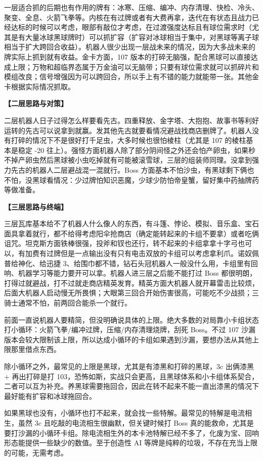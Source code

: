 \documentclass[12pt, a4paper]{article}
\begin{document}
一层适合抓的后期也有作用的牌有：冰寒、压缩、编冲、内存清理、快检、冷头、聚变、全息、火箭飞拳等。内核在有过牌或者有大费再拿，迭代在有状态且战力已经达标的时候可以考虑，眼部有敲位才考虑，在过渡强度达标且有球位需求时（尤其是有大量冰球黑球牌时）可以抓扩容（扩容对冰球相当于集中，对黑球等离子球相当于扩大跨回合收益）。机器人很少出现一层战未来的情况，因为大多战未来的牌实际上抓到就有收益。金卡方面，107 版本的打碎无脑强，配合黑球可以直接达成上限；万物和超临界态属于万金油可以无脑带；只要有球位需求就可以抓碎片和模组改良；信号增强因为可以跨回合，所以手上有不错的能力就能带一张。其他金卡根据实际情况抓取。

\textbf{【二层思路与对策】}

二层机器人日子过得怎么样要看先古。四重释放、金字塔、大抱抱、故事书等利好运转的先古可以说拿到就赢。发其他先古就要看情况避战找商店删牌了。机器人没有打碎的情况下不是很好打千足虫，大多时候也很怕棱柱（尤其是 107 的棱柱基本是稳定 -20 往上）。强怪方面机器人除了部分阴间怪之外还会怕产卵虫，如果秒不掉产卵虫然后黑球被小虫吃掉就有可能被滚雪球，三层的组装师同理。没拿到强力先古的机器人二层避战混一混就行。Boss 方面基本不怕沙虫，有黑球剩下俩也不怕，没黑球看情况：少过牌怕知识恶魔，少球少防怕帝皇蟹，留好集中药抽牌药等做准备。

\textbf{【三层思路与终端】}

三层瓦库基本给不了机器人什么像人的东西，有斗篷、悖论、模拟、音乐盒、宝石面具拿着就行，都不给得考虑阳伞抢商店（确定能转起来的卡组不要拿）或者吃俩诅咒。坦克斯方面铁棒很强，投斧和钗也还行，转不起来的卡组拿拿十字弓也可以，有加费有过牌但是一点输出没有只有电击双放的卡组可以考虑拿利爪。诺奴佩普给神化、给迅捷 3、给围巾都不错，钻石头冠机器人一般没什么用，卡组里有回响、机器学习等能力要开可以拿。机器人进三层之后能不能打过 Boss 都很明朗，打得过就避战，打不过就走商店精英发育。精英方面大机器人就开幕雷击比较烦，后面大机器人启动慢无所畏惧；大眼第三回合开始伤害很高，可能吃不少战损；三骑士通常不怕，前两回合能杀一个就行。

前面一直说机器人要精简，但没明确说具体的上限。绝大多数的对局靠小卡组状态打小循环：火箭飞拳/编冲过牌，压缩/内存清理烧牌，刮死 Boss。不过 107 沙漏版本会较大限制该上限，所以达成小循环的卡组如果遇到沙漏，要想办法从其他上限那里借点东西。

除小循环之外，最常见的上限是黑球，尤其是有漆黑和打碎的黑球，3c 出俩漆黑+ 再出打碎是打 103，恐怖如斯，实战只会更高，且黑球体系和小卡组体系契合，二者可以互为补充。养黑球需要拖回合，因此在转不起来不能一直出漆黑的情况下最好能有扩容和冰球拖回合。

如果黑球也没有，小循环也打不起来，就会找一些特解。最常见的特解是电流相生，虽然 3c 且吃敲的电流相生很幽默，但关键时候打 Boss 真的能救命，尤其是要打沙漏的小循环卡组。除电流相生外的本卡池特解已经不多了，化废为宝、回响形态能提供一些缺少的数值。至于创造性 AI 等牌是纯粹的垃圾，不存在充当上限的可能，无需考虑。
\end{document}
